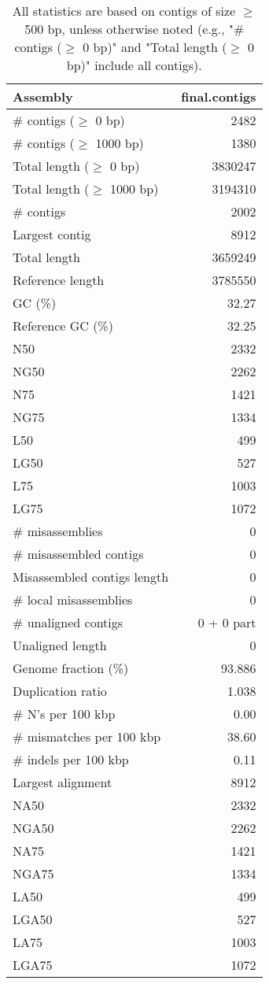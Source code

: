 \documentclass[12pt,a4paper]{article}
\begin{document}
\begin{table}[ht]
\begin{center}
\caption{All statistics are based on contigs of size $\geq$ 500 bp, unless otherwise noted (e.g., "\# contigs ($\geq$ 0 bp)" and "Total length ($\geq$ 0 bp)" include all contigs).}
\begin{tabular}{|l*{1}{|r}|}
\hline
Assembly & final.contigs \\ \hline
\# contigs ($\geq$ 0 bp) & 2482 \\ \hline
\# contigs ($\geq$ 1000 bp) & 1380 \\ \hline
Total length ($\geq$ 0 bp) & 3830247 \\ \hline
Total length ($\geq$ 1000 bp) & 3194310 \\ \hline
\# contigs & 2002 \\ \hline
Largest contig & 8912 \\ \hline
Total length & 3659249 \\ \hline
Reference length & 3785550 \\ \hline
GC (\%) & 32.27 \\ \hline
Reference GC (\%) & 32.25 \\ \hline
N50 & 2332 \\ \hline
NG50 & 2262 \\ \hline
N75 & 1421 \\ \hline
NG75 & 1334 \\ \hline
L50 & 499 \\ \hline
LG50 & 527 \\ \hline
L75 & 1003 \\ \hline
LG75 & 1072 \\ \hline
\# misassemblies & 0 \\ \hline
\# misassembled contigs & 0 \\ \hline
Misassembled contigs length & 0 \\ \hline
\# local misassemblies & 0 \\ \hline
\# unaligned contigs & 0 + 0 part \\ \hline
Unaligned length & 0 \\ \hline
Genome fraction (\%) & 93.886 \\ \hline
Duplication ratio & 1.038 \\ \hline
\# N's per 100 kbp & 0.00 \\ \hline
\# mismatches per 100 kbp & 38.60 \\ \hline
\# indels per 100 kbp & 0.11 \\ \hline
Largest alignment & 8912 \\ \hline
NA50 & 2332 \\ \hline
NGA50 & 2262 \\ \hline
NA75 & 1421 \\ \hline
NGA75 & 1334 \\ \hline
LA50 & 499 \\ \hline
LGA50 & 527 \\ \hline
LA75 & 1003 \\ \hline
LGA75 & 1072 \\ \hline
\end{tabular}
\end{center}
\end{table}
\end{document}
